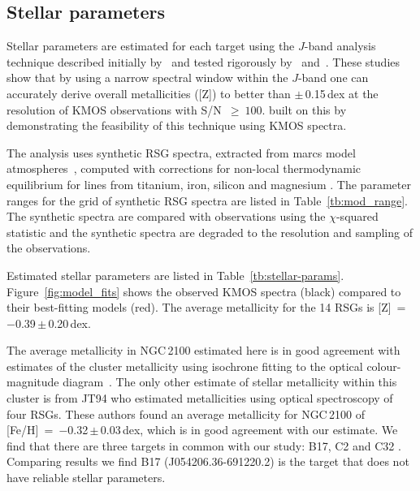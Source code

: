 \documentclass[useAMS,usenatbib]{mn2e}
\begin{document}

\subsection{Stellar parameters} %
\label{sub:stellar_parameters}

Stellar parameters are estimated for each target using the $J$-band analysis technique described initially by~\cite{2010MNRAS.407.1203D}
and tested rigorously by~\cite{2014ApJ...788...58G} and~\cite{2015ApJ...806...21D}.
These studies show that by using a narrow spectral window within the $J$-band one can accurately derive overall metallicities ([Z]) to better than
$\pm$\,0.15\,dex at the resolution of KMOS observations with S/N~$\ge~100$.
\cite{2015ApJ...803...14P} built on this by demonstrating the feasibility of this technique using KMOS spectra.

The analysis uses synthetic RSG spectra, extracted from {\sc marcs} model atmospheres~\citep{2008A&A...486..951G},
computed with corrections for non-local thermodynamic equilibrium for lines from titanium, iron, silicon and magnesium
\citep{2012ApJ...751..156B,2013ApJ...764..115B,2015ApJ...804..113B}.
The parameter ranges for the grid of synthetic RSG spectra are listed in Table~\ref{tb:mod_range}.
The synthetic spectra are compared with observations using the $\chi$-squared statistic and the synthetic spectra are degraded to the resolution and sampling of the observations.

Estimated stellar parameters are listed in Table~\ref{tb:stellar-params}.
Figure~\ref{fig:model_fits} shows the observed KMOS spectra (black) compared to their best-fitting models (red).
The average metallicity for the 14 RSGs is [Z]~=~$-$0.39\,$\pm$\,0.20\,dex.

The average metallicity in NGC\,2100 estimated here is in good agreement with estimates of the cluster metallicity using isochrone fitting to the optical colour-magnitude diagram~\citep[$-$0.34\,dex;][]{2015A&A...575A..62N}.
The only other estimate of stellar metallicity within this cluster is from JT94
who estimated metallicities using optical spectroscopy of four RSGs.
These authors found an average metallicity for NGC\,2100 of [Fe/H]~=~$-$0.32\,$\pm$\,0.03\,dex, which is in good agreement with our estimate.
We find that there are three targets in common with our study: B17, C2 and C32
\citep[using the][nomenclature]{1974A&AS...15..261R}.
Comparing results we find B17 (J054206.36-691220.2) is the target that does not have reliable stellar parameters.
\end{document}
